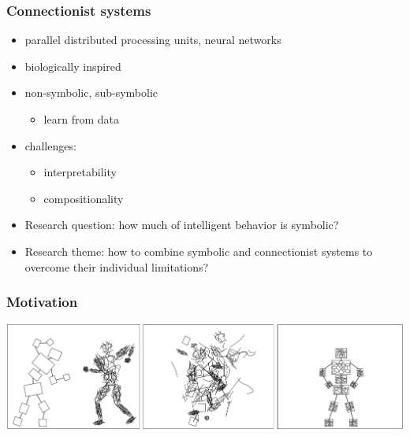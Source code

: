 \documentclass{beamer}
\begin{document}
\begin{frame}
  \frametitle{Connectionist systems}
  \begin{itemize}
  \item parallel distributed processing units, neural networks
  \item biologically inspired
  \item non-symbolic, sub-symbolic
    \begin{itemize}
    \item learn from data
    \end{itemize}
  \item challenges:
    \begin{itemize}
    \item interpretability
    \item compositionality
    \end{itemize}
  \item Research question: how much of intelligent behavior is
    symbolic?
  \item Research theme: how to combine symbolic and connectionist
    systems to overcome their individual limitations?
  \end{itemize}
\end{frame}

\begin{frame}
  \frametitle{Motivation}
  \includegraphics[width=\textwidth]{minsky-figure.png}
\end{frame}
\end{document}
